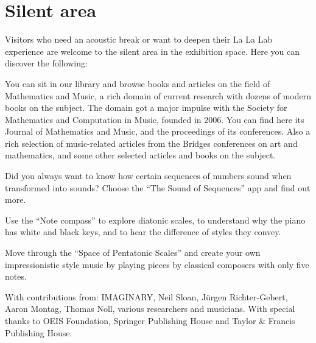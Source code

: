 \section{Silent area}
Visitors who need an acoustic break or want to deepen their La La Lab experience are welcome to the silent area in the exhibition space. Here you can discover the following:

You can sit in our library and browse books and articles on the field of Mathematics and Music, a rich domain of current research with dozens of modern books on the subject. The domain got a major impulse with the Society for Mathematics and Computation in Music, founded in 2006. You can find here its Journal of Mathematics and Music, and the proceedings of its conferences. Also a rich selection of music-related articles from the Bridges conferences on art and mathematics, and some other selected articles and books on the subject.

Did you always want to know how certain sequences of numbers sound when transformed into sounds? Choose the ``The Sound of Sequences'' app and find out more.

Use the ``Note compass'' to explore diatonic scales, to understand why the piano has white and black keys, and to hear the difference of styles they convey. 

Move through the ``Space of Pentatonic Scales'' and create your own impressionistic style music by playing pieces by classical composers with only five notes.

\vfill

With contributions from: IMAGINARY, Neil Sloan, Jürgen Richter-Gebert, Aaron Montag, Thomas Noll, various researchers and musicians. With special thanks to OEIS Foundation, Springer Publishing House and Taylor \& Francis Publishing House.

